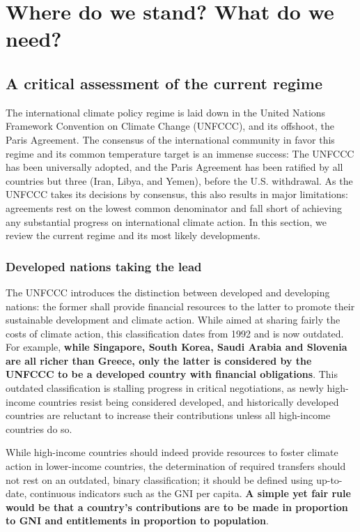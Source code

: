 \documentclass[12pt,english]{article}
\begin{document}
\clearpage

\section{Where do we stand? What do we need?\label{sec:now}}%


\subsection{A critical assessment of the current regime\label{subsec:criticism}}

The international climate policy regime is laid down in the United Nations Framework Convention on Climate Change (UNFCCC), and its offshoot, the Paris Agreement. The consensus of the international community in favor this regime and its common  temperature target is an immense success: The UNFCCC has been universally adopted, and the Paris Agreement has been ratified by all countries but three (Iran, Libya, and Yemen), before the U.S. withdrawal. As the UNFCCC takes its decisions by consensus, this also results in major limitations: agreements rest on the lowest common denominator and fall short of achieving any substantial progress on international climate action. In this section, we review the current regime and its most likely developments.

\subsubsection{Developed nations taking the lead\label{subsubsec:developed}}
The UNFCCC introduces the distinction between developed and developing nations: the former shall provide financial resources to the latter to promote their sustainable development and climate action. While aimed at sharing fairly the costs of climate action, this classification dates from 1992 and is now outdated. For example, \textbf{while Singapore, South Korea, Saudi Arabia and Slovenia are all richer than Greece, only the latter is considered by the UNFCCC to be a developed country with financial obligations}. This outdated classification is stalling progress in critical negotiations, as newly high-income countries resist being considered developed, and historically developed countries are reluctant to increase their contributions unless all high-income countries do so.

While high-income countries should indeed provide resources to foster climate action in lower-income countries, the determination of required transfers should not rest on an outdated, binary classification; it should be defined using up-to-date, continuous indicators such as the GNI per capita. \textbf{A simple yet fair rule would be that a country's contributions are to be made in proportion to GNI and entitlements in proportion to population}. 
\end{document}
